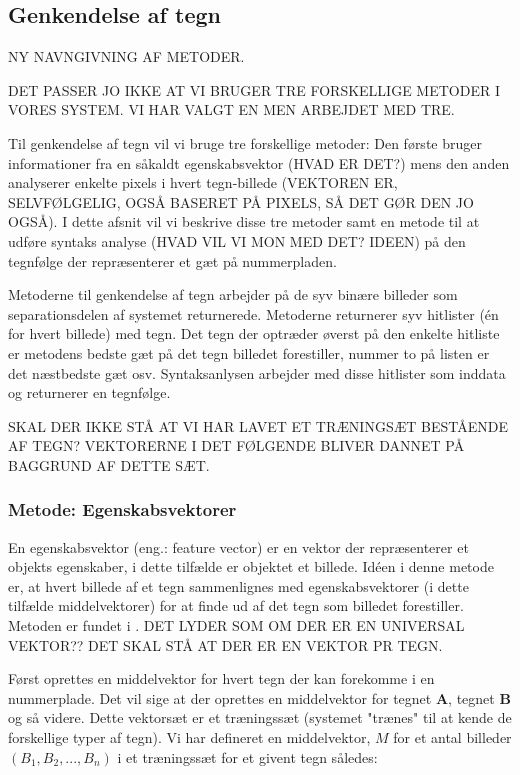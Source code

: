 \subsection{Genkendelse af tegn}

NY NAVNGIVNING AF METODER.

\label{sec_monster}
DET PASSER JO IKKE AT VI BRUGER TRE FORSKELLIGE METODER I VORES SYSTEM. VI HAR VALGT EN MEN ARBEJDET MED TRE.

Til genkendelse af tegn vil vi bruge tre forskellige metoder: Den første bruger informationer fra en såkaldt egenskabsvektor (HVAD ER DET?) mens den anden analyserer enkelte pixels i hvert tegn-billede (VEKTOREN ER, SELVFØLGELIG, OGSÅ BASERET PÅ PIXELS, SÅ DET GØR DEN JO OGSÅ). I dette afsnit vil vi beskrive disse tre metoder samt en metode til at udføre syntaks analyse (HVAD VIL VI MON MED DET? IDEEN) på den tegnfølge der repræsenterer et gæt på nummerpladen.

Metoderne til genkendelse af tegn arbejder på de syv binære billeder som separationsdelen af systemet returnerede. Metoderne returnerer syv hitlister (én for hvert billede) med tegn. Det tegn der optræder øverst på den enkelte hitliste er metodens bedste gæt på det tegn billedet forestiller, nummer to på listen er det næstbedste gæt osv. Syntaksanlysen arbejder med disse hitlister som inddata og returnerer en tegnfølge.

SKAL DER IKKE STÅ AT VI HAR LAVET ET TRÆNINGSÆT BESTÅENDE AF TEGN? VEKTORERNE I DET FØLGENDE BLIVER DANNET PÅ BAGGRUND AF DETTE SÆT.

\subsubsection{Metode: Egenskabsvektorer}
En egenskabsvektor (eng.: feature vector) er en vektor der repræsenterer et objekts egenskaber, i dette tilfælde er objektet et billede. Idéen i denne metode er, at hvert billede af et tegn sammenlignes med egenskabsvektorer (i dette tilfælde middelvektorer) for at finde ud af det tegn som billedet forestiller. Metoden er fundet i \cite{arth}. DET LYDER SOM OM DER ER EN UNIVERSAL VEKTOR?? DET SKAL STÅ AT DER ER EN VEKTOR PR TEGN.

Først oprettes en middelvektor for hvert tegn der kan forekomme i en nummerplade. Det vil sige at der oprettes en middelvektor for tegnet \textbf{A}, tegnet \textbf{B} og så videre. Dette vektorsæt er et træningssæt (systemet "trænes" til at kende de forskellige typer af tegn). Vi har defineret en middelvektor, $M$ for et antal billeder $(B_{1},B_{2},...,B_{n})$ i et træningssæt for et givent tegn således:

